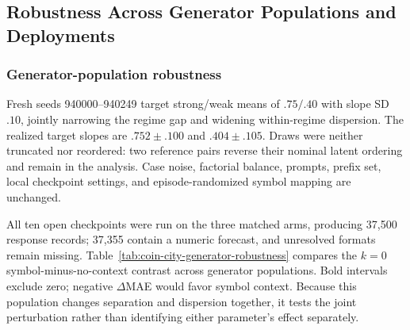 

\subsection{Robustness Across Generator Populations and Deployments}
\label{app:coin-city-robustness}

\subsubsection{Generator-population robustness}
Fresh seeds 940000--940249 target strong/weak means of \(.75/.40\)
with slope SD \(.10\), jointly narrowing the regime gap and widening
within-regime dispersion. The realized target slopes are
\(.752\pm.100\) and \(.404\pm.105\). Draws were neither truncated nor reordered:
two reference pairs reverse their nominal latent ordering and remain in the
analysis. Case noise, factorial balance, prompts, prefix set, local checkpoint
settings, and episode-randomized symbol mapping are unchanged.

All ten open checkpoints were run on the three matched arms, producing 37,500
response records; 37,355 contain a numeric forecast, and unresolved formats remain
missing. Table~\ref{tab:coin-city-generator-robustness} compares the
\(k=0\) symbol-minus-no-context contrast across generator populations. Bold
intervals exclude zero; negative \(\Delta\)MAE would favor symbol context.
Because this population changes separation and dispersion together, it tests the
joint perturbation rather than identifying either parameter's effect separately.

\begin{center}
\begin{minipage}{\linewidth}
\centering
{}
\label{tab:coin-city-generator-robustness}
\scriptsize
\setlength{\tabcolsep}{2.5pt}
\resizebox{\linewidth}{!}{}
\end{minipage}
\end{center}

